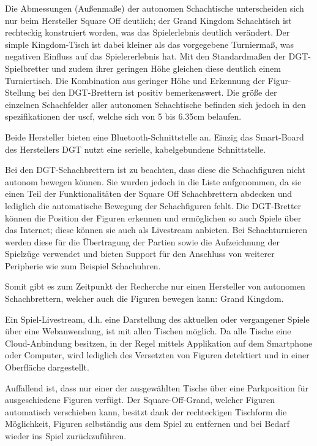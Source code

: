 Die Abmessungen (Außenmaße) der autonomen Schachtische unterscheiden
sich nur beim Hersteller Square Off deutlich; der Grand Kingdom
Schachtisch ist rechteckig konstruiert worden, was das Spielerlebnis
deutlich verändert. Der simple Kingdom-Tisch ist dabei kleiner als das
vorgegebene Turniermaß, was negativen Einfluss auf das Spielererlebnis
hat. Mit den Standardmaßen der DGT-Spielbretter und zudem ihrer geringen
Höhe gleichen diese deutlich einem Turniertisch. Die Kombination aus
geringer Höhe und Erkennung der Figur-Stellung bei den DGT-Brettern ist
positiv bemerkenswert. Die größe der einzelnen Schachfelder aller
autonomen Schachtische befinden sich jedoch in den spezifikationen der
\gls{uscf}\cite{officialuscfrules}, welche sich von 5 bis 6.35cm
belaufen.

Beide Hersteller bieten eine Bluetooth-Schnittstelle an. Einzig das
Smart-Board des Herstellers DGT nutzt eine serielle, kabelgebundene
Schnittstelle.

Bei den DGT-Schachbrettern ist zu beachten, dass diese die Schachfiguren
nicht autonom bewegen können. Sie wurden jedoch in die Liste
aufgenommen, da sie einen Teil der Funktionalitäten der Square Off
Schachbrettern abdecken und lediglich die automatische Bewegung der
Schachfiguren fehlt. Die DGT-Bretter können die Position der Figuren
erkennen und ermöglichen so auch Spiele über das Internet; diese können
sie auch als Livestream anbieten. Bei Schachturnieren werden diese für
die Übertragung der Partien sowie die Aufzeichnung der Spielzüge
verwendet und bieten Support für den Anschluss von weiterer Peripherie
wie zum Beispiel Schachuhren.

Somit gibt es zum Zeitpunkt der Recherche nur einen Hersteller von
autonomen Schachbrettern, welcher auch die Figuren bewegen kann: Grand
Kingdom.

Ein Spiel-Livestream, d.h. eine Darstellung des aktuellen oder
vergangener Spiele über eine Webanwendung, ist mit allen Tischen
möglich. Da alle Tische eine Cloud-Anbindung besitzen, in der Regel
mittels Applikation auf dem Smartphone oder Computer, wird lediglich des
Versetzten von Figuren detektiert und in einer Oberfläche dargestellt.

Auffallend ist, dass nur einer der ausgewählten Tische über eine
Parkposition für ausgeschiedene Figuren verfügt. Der Square-Off-Grand,
welcher Figuren automatisch verschieben kann, besitzt dank der
rechteckigen Tischform die Möglichkeit, Figuren selbständig aus dem
Spiel zu entfernen und bei Bedarf wieder ins Spiel zurückzuführen.

